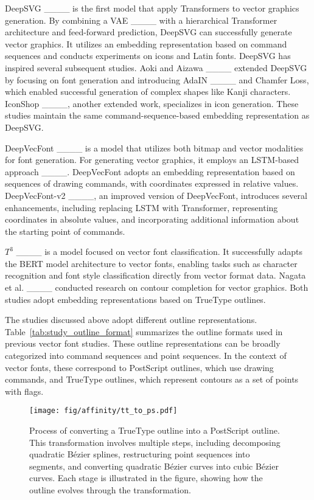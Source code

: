 DeepSVG ____ is the first model that apply Transformers to vector graphics generation.
By combining a VAE ____ with a hierarchical Transformer architecture and feed-forward prediction, DeepSVG can successfully generate vector graphics.
It utilizes an embedding representation based on command sequences and conducts experiments on icons and Latin fonts.
DeepSVG has inspired several subsequent studies.
Aoki and Aizawa ____ extended DeepSVG by focusing on font generation and introducing AdaIN ____ and Chamfer Loss, which enabled successful generation of complex shapes like Kanji characters.
IconShop ____, another extended work, specializes in icon generation.
These studies maintain the same command-sequence-based embedding representation as DeepSVG.

DeepVecFont ____ is a model that utilizes both bitmap and vector modalities for font generation.
For generating vector graphics, it employs an LSTM-based approach ____.
DeepVecFont adopts an embedding representation based on sequences of drawing commands, with coordinates expressed in relative values.
DeepVecFont-v2 ____, an improved version of DeepVecFont, introduces several enhancements,
including replacing LSTM with Transformer, representing coordinates in absolute values, and incorporating additional information about the starting point of commands.

$T^3$ ____ is a model focused on vector font classification.
It successfully adapts the BERT model architecture to vector fonts, enabling tasks such as character recognition and font style classification directly from vector format data.
Nagata et al. ____ conducted research on contour completion for vector graphics.
Both studies adopt embedding representations based on TrueType outlines.

The studies discussed above adopt different outline representations.
Table~\ref{tab:study_outline_format} summarizes the outline formats used in previous vector font studies.
These outline representations can be broadly categorized into command sequences and point sequences.
In the context of vector fonts, these correspond to PostScript outlines, which use drawing commands, and TrueType outlines, which represent contours as a set of points with flags.

\begin{figure*}[!t]
    \centerline{\texttt{[image: fig/affinity/tt\_to\_ps.pdf]}}
    \caption{
        Process of converting a TrueType outline into a PostScript outline.
        This transformation involves multiple steps, including decomposing quadratic Bézier splines, restructuring point sequences into segments, and converting quadratic Bézier curves into cubic Bézier curves.
        Each stage is illustrated in the figure, showing how the outline evolves through the transformation.
    }
    \label{fig:tt_to_ps}
\end{figure*}